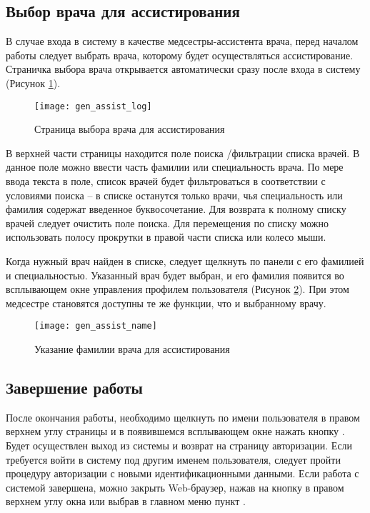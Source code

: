 {
\subsection{Выбор врача для ассистирования} \label{gen_assist}

В случае входа в систему в качестве медсестры-ассистента врача, перед началом работы следует выбрать врача, которому будет осуществляться ассистирование. Страничка выбора врача открывается автоматически сразу после входа в систему (Рисунок \ref{img_gen_assist_log}). 

 \begin{figure}[!ht]\centering
 	\texttt{[image: gen\_assist\_log]}
 	\caption{Страница выбора врача для ассистирования}
 	\label{img_gen_assist_log}
 \end{figure} 

В верхней части страницы находится поле поиска \slash фильтрации списка врачей. В данное поле можно ввести часть фамилии или специальность врача. По мере ввода текста в поле, список врачей будет фильтроваться в соответствии с условиями поиска -- в списке останутся только врачи, чья специальность или фамилия содержат введенное буквосочетание. Для возврата к полному списку врачей следует очистить поле поиска. Для перемещения по списку можно использовать полосу прокрутки в правой части списка или колесо мыши.

Когда нужный врач найден в списке, следует щелкнуть по панели с его фамилией и специальностью. Указанный врач будет выбран, и его фамилия появится во всплывающем окне управления профилем пользователя (Рисунок \ref{img_gen_assist_name}). При этом медсестре становятся доступны те же функции, что и выбранному врачу.

 \begin{figure}[!ht]\centering
 	\texttt{[image: gen\_assist\_name]}
 	\caption{Указание фамилии врача для ассистирования}
 	\label{img_gen_assist_name}
 \end{figure}
}{} 
 
\subsection{Завершение работы} \label{gen_exit}

После окончания работы, необходимо щелкнуть по имени пользователя в правом верхнем углу страницы и в появившемся всплывающем окне нажать кнопку .  Будет осуществлен выход из системы и возврат на страницу авторизации. Если требуется войти в систему под другим именем пользователя, следует пройти процедуру авторизации с новыми идентификационными данными. Если работа с системой завершена, можно закрыть Web-браузер, нажав на кнопку  в правом верхнем углу окна или выбрав в главном меню пункт .


